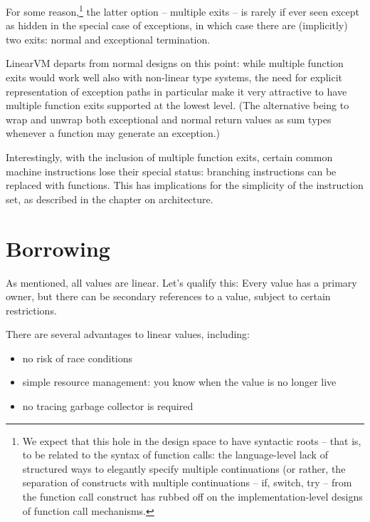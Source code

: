 \documentclass[a4paper]{book}
\begin{document}
For some reason,\footnote{
  We expect that this hole in the design space to have syntactic roots
  -- that is, to be related to the syntax of function calls:
  the language-level lack of structured ways to elegantly specify
  multiple continuations (or rather, the separation of constructs with
  multiple continuations -- if, switch, try -- from the function call
  construct has rubbed off
  on the implementation-level designs of function call mechanisms.
} the latter option -- multiple exits -- is rarely if
ever seen except as hidden in the special case of exceptions, in which
case there are (implicitly) two exits: normal and exceptional termination.

LinearVM departs from normal designs on this point: while multiple
function exits would work well also with non-linear type systems,
the need for explicit representation of exception paths in particular
make it very attractive to have multiple function exits supported at the
lowest level.
(The alternative being to wrap and unwrap both exceptional and normal
return values as sum types whenever a function may generate an exception.)

\smallskip
Interestingly, with the inclusion of multiple function exits, certain
common machine instructions lose their special status: branching instructions
can be replaced with functions. This has implications for the
simplicity of the instruction set, as described in the chapter on architecture.

\section{Borrowing}
\label{sec:design-borrowing}
As mentioned, all values are linear.  Let's qualify this: Every value
has a primary owner, but there can be secondary references to a value,
subject to certain restrictions.

There are several advantages to linear values, including:
\begin{itemize}
\item no risk of race conditions
\item simple resource management: you know when the value is no longer live
\item no tracing garbage collector is required
\end{itemize}
\end{document}
